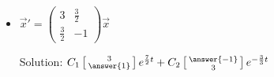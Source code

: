 \documentclass{ximera}
\begin{document}
\begin{exercise}
\begin{itemize}
        \item $\vec{x}'=\begin{pmatrix} 3& \frac{3}{2}\\ \frac{3}{2} & -1 \end{pmatrix}\vec{x}$ %
            \begin{multipleChoice}
            \end{multipleChoice}
            Solution: $C_1\left[\begin{smallmatrix} 3 \\ \answer{1} \end{smallmatrix}\right]e^{\frac{7}{2}t} + C_2\left[\begin{smallmatrix} \answer{-1} \\ 3 \end{smallmatrix}\right]e^{-\frac{3}{3}t}$  \\
            
    \end{itemize}
\end{exercise}
\end{document}
